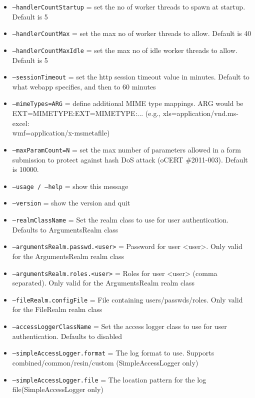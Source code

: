 \begin{itemize}
       \item{\texttt{--handlerCountStartup}    = set the no of worker threads to spawn at startup. Default is 5}
       \item{\texttt{--handlerCountMax}        = set the max no of worker threads to allow. Default is 40}
       \item{\texttt{--handlerCountMaxIdle}    = set the max no of idle worker threads to allow. Default is 5}
       
       \item{\texttt{--sessionTimeout}         = set the http session timeout value in minutes. Default to what webapp specifies, and then to 60 minutes}
       \item{\texttt{--mimeTypes=ARG}          = define additional MIME type mappings. ARG would be \\EXT=MIMETYPE:EXT=MIMETYPE:...
                                  (e.g., xls=application/vnd.ms-excel:\\wmf=application/x-msmetafile)}
       \item{\texttt{--maxParamCount=N}        = set the max number of parameters allowed in a form submission to protect
                                  against hash DoS attack (oCERT \#2011-003). Default is 10000.}
       \item{\texttt{--usage / --help}         = show this message}
       \item{\texttt{--version}                = show the version and quit}
       
       \item{\texttt{--realmClassName}               = Set the realm class to use for user authentication. Defaults to ArgumentsRealm class}
       
       \item{\texttt{--argumentsRealm.passwd.<user>} = Password for user <user>. Only valid for the ArgumentsRealm realm class}
       \item{\texttt{--argumentsRealm.roles.<user>}  = Roles for user <user> (comma separated). Only valid for the ArgumentsRealm realm class}
       
       \item{\texttt{--fileRealm.configFile}         = File containing users/passwds/roles. Only valid for the FileRealm realm class}
       
       \item{\texttt{--accessLoggerClassName}        = Set the access logger class to use for user authentication. Defaults to disabled}
       \item{\texttt{--simpleAccessLogger.format}    = The log format to use. Supports \\combined/common/resin/custom (SimpleAccessLogger only)}
       \item{\texttt{--simpleAccessLogger.file}      = The location pattern for the log file(SimpleAccessLogger only)}
    \end{itemize}


